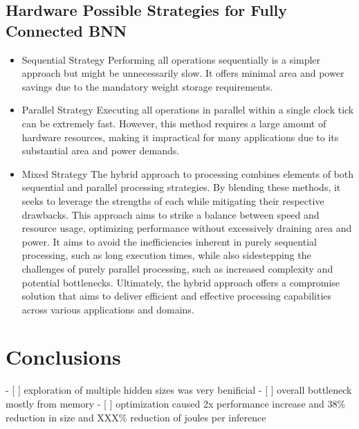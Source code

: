 \documentclass[conference]{IEEEtran}
\begin{document}
    \subsection{Hardware Possible Strategies for Fully Connected BNN}
    \begin{itemize}
        \item Sequential Strategy
        Performing all operations sequentially is a simpler approach but might be unnecessarily slow. It offers minimal area and power savings due to the mandatory weight storage requirements.
        \item Parallel Strategy
        Executing all operations in parallel within a single clock tick can be extremely fast. However, this method requires a large amount of hardware resources, making it impractical for many applications due to its substantial area and power demands.
        \item Mixed Strategy
        The hybrid approach to processing combines elements of both sequential and parallel processing strategies. By blending these methods, it seeks to leverage the strengths of each while mitigating their respective drawbacks. This approach aims to strike a balance between speed and resource usage, optimizing performance without excessively draining area and power. It aims to avoid the inefficiencies inherent in purely sequential processing, such as long execution times, while also sidestepping the challenges of purely parallel processing, such as increased complexity and potential bottlenecks. Ultimately, the hybrid approach offers a compromise solution that aims to deliver efficient and effective processing capabilities across various applications and domains.
    \end{itemize}
\section{Conclusions}
\label{sec:conclusions}
	- [ ] exploration of multiple hidden sizes was very benificial
	- [ ] overall bottleneck mostly from memory
	- [ ] optimization caused 2x performance increase and 38\% reduction in size and XXX\% reduction of joules per inference
\end{document}

